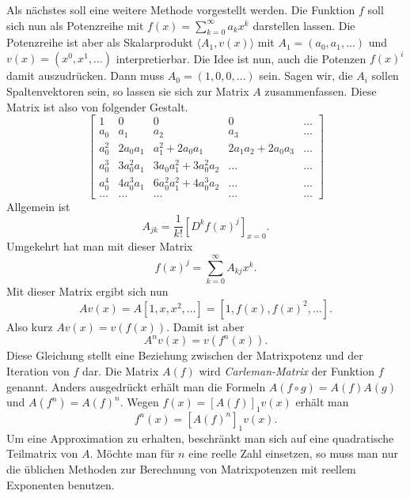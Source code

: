 \documentclass[a4paper,10pt,fleqn,twocolumn,twoside]{article}
\numberwithin{equation}{section}
\begin{document}
Als nächstes soll eine weitere Methode vorgestellt werden. Die
Funktion $f$ soll sich nun als Potenzreihe mit
$f(x)=\sum_{k=0}^\infty a_kx^k$ darstellen lassen. Die Potenzreihe
ist aber als Skalarprodukt $\langle A_1,v(x)\rangle$ mit
$A_1=(a_0,a_1,\ldots)$ und $v(x)=(x^0,x^1,\ldots)$
interpretierbar. Die Idee ist nun, auch die Potenzen $f(x)^i$ damit
auszudrücken. Dann muss $A_0=(1,0,0,\ldots)$ sein. Sagen wir, die
$A_i$ sollen Spaltenvektoren sein, so lassen sie sich zur Matrix
$A$ zusammenfassen. Diese Matrix ist also von folgender Gestalt.
\[\begin{bmatrix}
1 & 0 & 0 & 0 & \ldots\\
a_0 & a_1 & a_2 & a_3 & \ldots\\
a_0^2 & 2a_0a_1 & a_1^2+2a_0a_1 & 2a_1a_2+2a_0a_3 &\ldots\\
a_0^3 & 3a_0^2a_1 & 3a_0a_1^2+3a_0^2a_2 &\ldots &\ldots\\
a_0^4 & 4a_0^3a_1 & 6a_0^2a_1^2+4a_0^3a_2 & \ldots & \ldots\\
\ldots &\ldots &\ldots &\ldots & \ldots
\end{bmatrix}\]
Allgemein ist
\begin{equation}
A_{jk} = \frac{1}{k!}[D^k f(x)^j]_{x=0}.
\end{equation}
Umgekehrt hat man mit dieser Matrix
\begin{equation}
f(x)^j = \sum_{k=0}^\infty A_{kj} x^k.
\end{equation}
Mit dieser Matrix ergibt sich nun
\begin{equation}
Av(x) = A[1,x,x^2,\ldots] = [1,f(x),f(x)^2,\ldots].
\end{equation}
Also kurz $Av(x)=v(f(x))$. Damit ist aber
\begin{equation}
A^n v(x) = v(f^n(x)).
\end{equation}
Diese Gleichung stellt eine Beziehung zwischen der Matrixpotenz und
der Iteration von $f$ dar. Die Matrix $A(f)$ wird
\textit{Carleman-Matrix}
der Funktion $f$ genannt. Anders ausgedrückt erhält man die Formeln
$A(f\circ g) = A(f)A(g)$ und $A(f^n)=A(f)^n$.
Wegen $f(x)=[A(f)]_1v(x)$ erhält man
\begin{equation}
f^n(x) = [A(f)^n]_1v(x).
\end{equation}
Um eine Approximation zu erhalten, beschränkt man sich auf eine
quadratische Teilmatrix von $A$. Möchte man für $n$ eine reelle
Zahl einsetzen, so muss man nur die üblichen Methoden zur Berechnung
von Matrixpotenzen mit reellem Exponenten benutzen.
\end{document}
